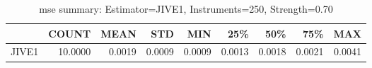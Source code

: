 \begin{table}[ht]
\centering
\caption{mse summary: Estimator=JIVE1, Instruments=250, Strength=0.70}
\begin{tabular}{lrrrrrrrr}
\toprule
 & COUNT & MEAN & STD & MIN & 25\% & 50\% & 75\% & MAX \\
\midrule
JIVE1 & 10.0000 & 0.0019 & 0.0009 & 0.0009 & 0.0013 & 0.0018 & 0.0021 & 0.0041 \\
\bottomrule
\end{tabular}
\end{table}
